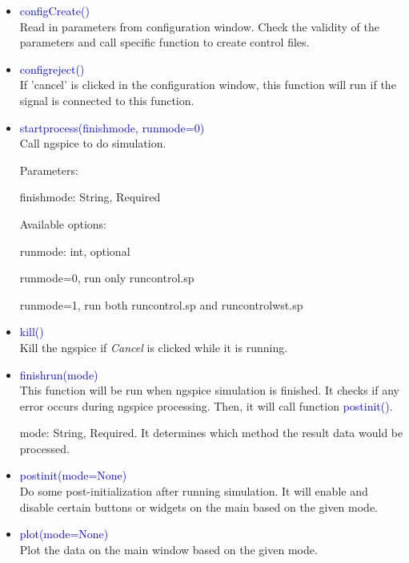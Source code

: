 \documentclass[12pt,a4paper]{article}
\begin{document}
\begin{itemize}[leftmargin=*]
\begin{itemize}
    \item \textcolor{blue}{configCreate()}\\
        Read in parameters from configuration window. Check the validity of the parameters and call specific function to create control files.

    \item \textcolor{blue}{configreject()}\\
        If 'cancel' is clicked in the configuration window, this function will run if the signal is connected to this function.

    \item \textcolor{blue}{start\textunderscore process(finishmode, runmode=0)}\\
        Call ngspice to do simulation.

        Parameters:

        \quad finishmode: String, Required

        \quad Available options:

        \quad runmode: int, optional

        \quad runmode=0, run only run\textunderscore control.sp

        \quad runmode=1, run both run\textunderscore control.sp and run\textunderscore control\textunderscore wst.sp

    \item \textcolor{blue}{kill()}\\
        Kill the ngspice if \textit{Cancel} is clicked while it is running.

    \item \textcolor{blue}{finishrun(mode)}\\
        This function will be run when ngspice simulation is finished. It checks if any error occurs during ngspice processing. Then, it will call function \textcolor{blue}{postinit()}.

        mode: String, Required. It determines which method the result data would be processed.

    \item \textcolor{blue}{postinit(mode=None)}\\
        Do some post-initialization after running simulation. It will enable and disable certain buttons or widgets on the main based on the given mode.

    \item \textcolor{blue}{plot(mode=None)}\\
        Plot the data on the main window based on the given mode.


\end{itemize}
\end{itemize}
\end{document}
